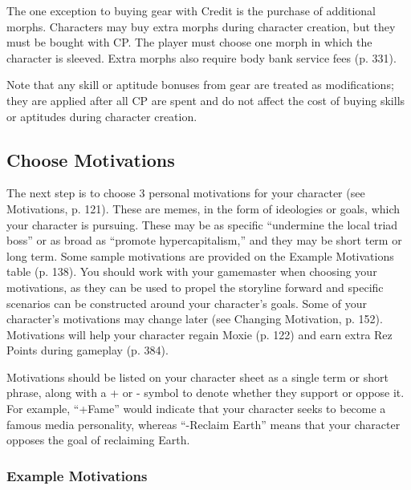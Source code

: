 The one exception to buying gear with Credit is the purchase of additional morphs. Characters may buy extra morphs during character creation, but they must be bought with CP. The player must choose one morph in which the character is sleeved. Extra morphs also require body bank service fees (p. 331). 

Note that any skill or aptitude bonuses from gear are treated as modifications; they are applied after all CP are spent and do not affect the cost of buying skills or aptitudes during character creation. 

\subsection{Choose Motivations} \label{sec:choose-motivations} 

The next step is to choose 3 personal motivations for your character (see Motivations, p. 121). These are memes, in the form of ideologies or goals, which your character is pursuing. These may be as specific “undermine the local triad boss” or as broad as “promote hypercapitalism,” and they may be short term or long term. Some sample motivations are provided on the Example Motivations table (p. 138). You should work with your gamemaster when choosing your motivations, as they can be used to propel the storyline forward and specific scenarios can be constructed around your character’s goals. Some of your character’s motivations may change later (see Changing Motivation, p. 152). Motivations will help your character regain Moxie (p. 122) and earn extra Rez Points during gameplay (p. 384). 

Motivations should be listed on your character sheet as a single term or short phrase, along with a + or - symbol to denote whether they support or oppose it. For example, “+Fame” would indicate that your character seeks to become a famous media personality, whereas “-Reclaim Earth” means that your character opposes the goal of reclaiming Earth. 

\subsubsection{Example Motivations} \label{sec:example-motivations} 


